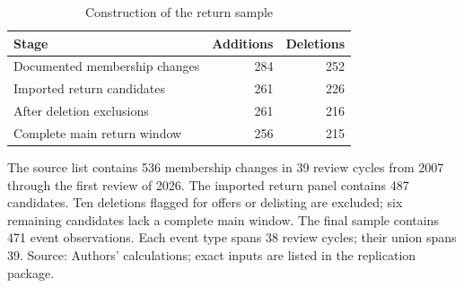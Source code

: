 \begin{table}[!htbp]
\centering
\caption{Construction of the return sample}\label{tab:sample}
\small
\setlength{\tabcolsep}{5pt}
\begin{tabular}{lrr}
\toprule
Stage & Additions & Deletions \\
\midrule
Documented membership changes & 284 & 252 \\
Imported return candidates & 261 & 226 \\
After deletion exclusions & 261 & 216 \\
Complete main return window & 256 & 215 \\
\bottomrule
\end{tabular}
\begin{minipage}{\linewidth}\footnotesize\vspace{5pt}
The source list contains 536 membership changes in 39 review cycles from 2007 through the first review of 2026. The imported return panel contains 487 candidates. Ten deletions flagged for offers or delisting are excluded; six remaining candidates lack a complete main window. The final sample contains 471 event observations. Each event type spans 38 review cycles; their union spans 39. Source: Authors' calculations; exact inputs are listed in the replication package.
\end{minipage}
\end{table}
